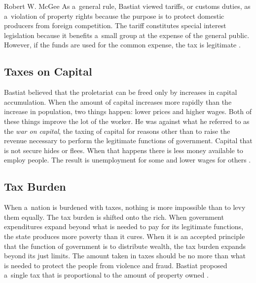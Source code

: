 \begin{artengenv}{Robert W. McGee}
As a~general rule, Bastiat viewed tariffs, or customs duties, as a~violation of property rights because the purpose is to protect domestic producers from foreign competition. The tariff constitutes special interest legislation because it benefits a~small group at the expense of the general public. However, if the funds are used for the common expense, the tax is legitimate 
\parencite[][pp.111–112]{bastiat_selected_1964}.%




\subsection{Taxes on Capital }



Bastiat believed that the proletariat can be freed only by increases in capital accumulation. When the amount of capital increases more rapidly than the increase in population, two things happen: lower prices and higher wages. Both of these things improve the lot of the worker. He was against what he referred to as the \textit{war on capital}, the taxing of capital for reasons other than to raise the revenue necessary to perform the legitimate functions of government. Capital that is not secure hides or flees. When that happens there is less money available to employ people. The result is unemployment for some and lower wages for others 
\parencite[][pp.184–185]{bastiat_selected_1964}.%




\subsection{Tax Burden }



When a~nation is burdened with taxes, nothing is more impossible than to levy them equally. The tax burden is shifted onto the rich. When government expenditures expand beyond what is needed to pay for its legitimate functions, the state produces more poverty than it cures. When it is an accepted principle that the function of government is to distribute wealth, the tax burden expands beyond its just limits. The amount taken in taxes should be no more than what is needed to protect the people from violence and fraud. Bastiat proposed a~single tax that is proportional to the amount of property owned 
\parencite[][pp.125–126]{bastiat_selected_1964}.%





\end{artengenv}
